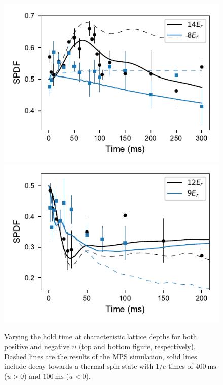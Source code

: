\documentclass[aps,prl,twocolumn,superscriptaddress]{revtex4-1}
\begin{document}
\begin{figure}
    \centering
    \includegraphics[width=\columnwidth]{figs/hold-time-scans/positive-u-scan-hold-time.pdf}\vspace{-0.8\baselineskip}
    \includegraphics[width=\columnwidth]{figs/hold-time-scans/negative-u-scan-hold-time.pdf}
    \caption{Varying the hold time at characteristic lattice depths for both positive and negative $u$ (top and bottom figure, respectively). Dashed lines are the results of the MPS simulation, solid lines include decay towards a thermal spin state with $1/e$ times of $400~\mathrm{ms}$ ($u > 0$) and $100~\mathrm{ms}$ ($u < 0$).}
    \label{fig:hold_time_scan}
\end{figure}
\end{document}

